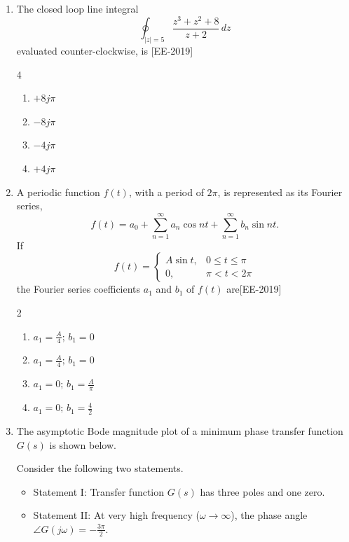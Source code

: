 \documentclass[journal]{IEEEtran}
\begin{document}
\begin{enumerate}

\item The closed loop line integral
\[
\oint_{|z|=5} \frac{z^3 + z^2 + 8}{z + 2} \, dz
\]
evaluated counter-clockwise, is \hfill{[EE-2019]}
\begin{multicols}{4}
    

\begin{enumerate}
    \item  $+8j\pi$
    \item  $-8j\pi$
    \item  $-4j\pi$
    \item  $+4j\pi$
\end{enumerate}
\end{multicols}

\item A periodic function $f(t)$, with a period of $2\pi$, is represented as its Fourier series,
\[
f(t) = a_0 + \sum_{n=1}^{\infty} a_n \cos nt + \sum_{n=1}^{\infty} b_n \sin nt.
\]
If
\[
f(t) = \begin{cases} 
      A \sin t, & 0 \leq t \leq \pi \\
      0, & \pi < t < 2\pi 
   \end{cases}
\]
the Fourier series coefficients $a_1$ and $b_1$ of $f(t)$ are\hfill{[EE-2019]}
\begin{multicols}{2}
    

\begin{enumerate}
    \item  $a_1 = \frac{A}{4}; \, b_1 = 0$
    \item  $a_1 = \frac{A}{4}; \, b_1 = 0$
    \item  $a_1 = 0; \, b_1 = \frac{A}{\pi}$
    \item  $a_1 = 0; \, b_1 = \frac{4}{2}$
\end{enumerate}
\end{multicols}
\item The asymptotic Bode magnitude plot of a minimum phase transfer function $G(s)$ is shown below.
\begin{figure}[H]
\centering


\end{figure}

Consider the following two statements.
\begin{itemize}
    \item Statement I: Transfer function $G(s)$ has three poles and one zero.
    \item Statement II: At very high frequency ($\omega \to \infty$), the phase angle $\angle G(j\omega) = -\frac{3\pi}{2}$.
\end{itemize}


\end{enumerate}
\end{document}

